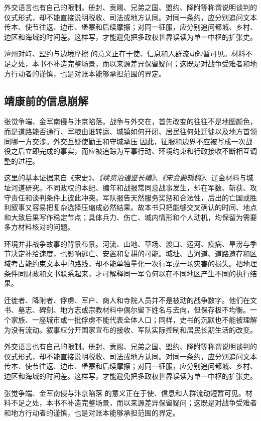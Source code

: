 外交语言也有自己的限制。册封、贡赐、兄弟之国、盟约、降附等称谓说明谈判的仪式形式，却不能直接说明税收、司法或地方认同。对同一条约，应分别追问文本传本、使节往返、边市、堡寨和后续摩擦；对同一征服，应分别追问都城、乡村、边区和海域的时间差。这样写，才能避免把多政权世界误读为单一中枢的扩张史。

澶州对峙、盟约与边境摩擦 的意义正在于使、信息和人群流动短暂可见。材料不足之处，本书不补造完整场景，而以来源差异保留疑问；这既是对战争受难者和地方行动者的谨慎，也是对账本能够承担范围的界定。

\subsection{靖康前的信息崩解}

张觉争端、金军南侵与汴京陷落。战争与外交在，首先改变的往往不是地图颜色，而是道路能否通行、军粮由谁转运、城镇如何开闭、居民往何处迁徙以及地方首领同哪一方交涉。外交互疑使勤王和守城承压 因此，征服和边界不应被写成一次战役之后立即完成的事实，而应被追踪为军事行动、环境约束和行政接收不断相互调整的过程。

这里的基本证据来自《宋史》、\textit{《续资治通鉴长编》}、\textit{《宋会要辑稿》}、辽金材料与城址河道研究。不同政权的本纪、编年和战报常同意战事发生，却在军数、斩获、攻守责任和谈判条件上彼此冲突。军队报告天然服务奖惩和合法性，后出的亡国或胜利叙事又容易把复杂选择压缩成必然结果。故本书只把能够交叉确认的时间、地点和大致后果写作稳定节点；具体兵力、伤亡、城内情形和个人动机，均保留为需要多方材料核对的问题。

环境并非战争故事的背景布景。河流、山地、草场、渡口、运河、疫病、旱涝与季节决定补给速度，也影响逃亡、安置和复耕的可能。城址、古河道、道路遗存和区域考古能约束文本中的路线，却不能单独量化一次行军或一场灾害的损失。把地理条件同财政和文书联系起来，才可解释同一军令何以在不同地区产生不同的执行结果。

迁徙者、降附者、俘虏、军户、商人和寺院人员并不是被动的战争数字。他们在文书、墓志、碑刻、地方志或宗教材料中偶尔留下姓名与去向，但保存极不均衡。一个家族、一座城市或一批俘虏不能代表全体人口；同样，史书的沉默也不能被理解为没有流动。叙事应分开国家宣布的接收、军队实际控制和居民长期生活的改变。

外交语言也有自己的限制。册封、贡赐、兄弟之国、盟约、降附等称谓说明谈判的仪式形式，却不能直接说明税收、司法或地方认同。对同一条约，应分别追问文本传本、使节往返、边市、堡寨和后续摩擦；对同一征服，应分别追问都城、乡村、边区和海域的时间差。这样写，才能避免把多政权世界误读为单一中枢的扩张史。

张觉争端、金军南侵与汴京陷落 的意义正在于使、信息和人群流动短暂可见。材料不足之处，本书不补造完整场景，而以来源差异保留疑问；这既是对战争受难者和地方行动者的谨慎，也是对账本能够承担范围的界定。

